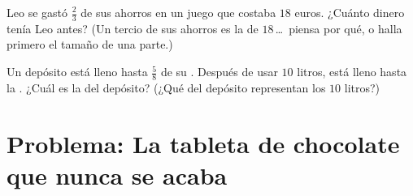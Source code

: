 \begin{exercise}[$\star\star$]\label{exo:g6:fractions:11}
Leo se gastó $\frac23$ de sus ahorros en un juego que costaba $18$ euros. ¿Cuánto
dinero tenía Leo antes? (Un tercio de sus ahorros es la  de
$18$\,\dots\ piensa por qué, o halla primero el tamaño de una parte.)
\end{exercise}

\begin{exercise}[$\star\star\star$]\label{exo:g6:fractions:12}
Un depósito está lleno hasta $\frac58$ de su . Después de usar $10$ litros,
está lleno hasta la . ¿Cuál es la  del depósito? (¿Qué  del
depósito representan los $10$ litros?)
\end{exercise}

\section{Problema: La tableta de chocolate que nunca se acaba}

